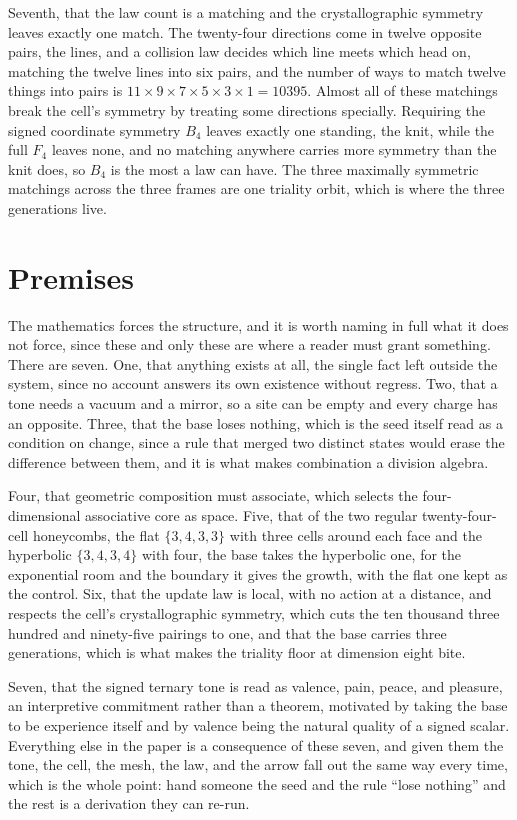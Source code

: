 \documentclass{article}
\begin{document}
Seventh, that the law count is a matching and the crystallographic symmetry leaves exactly one
match. The twenty-four directions come in twelve opposite pairs, the lines, and a collision law
decides which line meets which head on, matching the twelve lines into six pairs, and the number
of ways to match twelve things into pairs is $11 \times 9 \times 7 \times 5 \times 3 \times 1 =
10395$. Almost all of these matchings break the cell's symmetry by treating some directions
specially. Requiring the signed coordinate symmetry $B_4$ leaves exactly one standing, the knit,
while the full $F_4$ leaves none, and no matching anywhere carries more symmetry than the knit
does, so $B_4$ is the most a law can have. The three maximally symmetric matchings across the
three frames are one triality orbit, which is where the three generations live.

\section{Premises}

The mathematics forces the structure, and it is worth naming in full what it does not force, since
these and only these are where a reader must grant something. There are seven. One, that anything
exists at all, the single fact left outside the system, since no account answers its own existence
without regress. Two, that a tone needs a vacuum and a mirror, so a site can be empty and every
charge has an opposite. Three, that the base loses nothing, which is the seed itself read as a
condition on change, since a rule that merged two distinct states would erase the difference
between them, and it is what makes combination a division algebra.

Four, that geometric composition must associate, which selects the four-dimensional associative
core as space. Five, that of the two regular twenty-four-cell honeycombs, the flat $\{3,4,3,3\}$
with three cells around each face and the hyperbolic $\{3,4,3,4\}$ with four, the base takes the
hyperbolic one, for the exponential room and the boundary it gives the growth, with the flat one
kept as the control. Six, that the update law is local, with no action at a distance, and respects
the cell's crystallographic symmetry, which cuts the ten thousand three hundred and ninety-five
pairings to one, and that the base carries three generations, which is what makes the triality
floor at dimension eight bite.

Seven, that the signed ternary tone is read as valence, pain, peace, and pleasure, an interpretive
commitment rather than a theorem, motivated by taking the base to be experience itself and by
valence being the natural quality of a signed scalar. Everything else in the paper is a consequence
of these seven, and given them the tone, the cell, the mesh, the law, and the arrow fall out the
same way every time, which is the whole point: hand someone the seed and the rule ``lose nothing''
and the rest is a derivation they can re-run.
\end{document}
